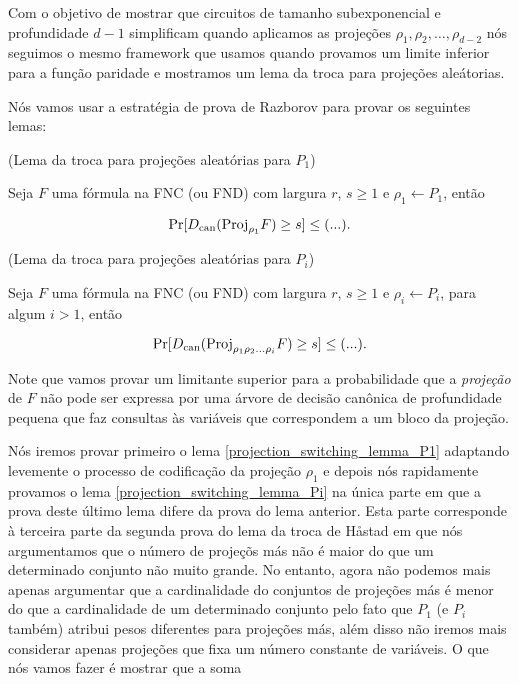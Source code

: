 Com o objetivo de mostrar que circuitos de tamanho subexponencial e profundidade $d - 1$ simplificam quando aplicamos as projeções $\rho_{1}, \rho_{2}, \dots, \rho_{d - 2}$ nós seguimos o mesmo framework que usamos quando provamos um limite inferior para a função paridade e mostramos um lema da troca para projeções aleátorias.

Nós vamos usar a estratégia de prova de Razborov para provar os seguintes lemas:

\begin{lema} (Lema da troca para projeções aleatórias para $P_{1}$) \label{projection_switching_lemma_P1}

Seja $F$ uma fórmula na FNC (ou FND) com largura $r$, $s \geq 1$ e $\rho_{1} \leftarrow P_{1}$, então

\begin{equation*}
	\Pr[D_{\text{can}}(\text{Proj}_{\rho_{1}}F) \geq s] \leq (...).
\end{equation*} 

\end{lema}

\begin{lema} (Lema da troca para projeções aleatórias para $P_{i}$) \label{projection_switching_lemma_Pi}

Seja $F$ uma fórmula na FNC (ou FND) com largura $r$, $s \geq 1$ e $\rho_{i} \leftarrow P_{i}$, para algum $i > 1$, então

\begin{equation*}
	\Pr[D_{\text{can}}(\text{Proj}_{\rho_{1}\rho_{2}\dots\rho_{i}}F) \geq s] \leq (...).
\end{equation*} 

\end{lema}

Note que vamos provar um limitante superior para a probabilidade que a \emph{projeção} de $F$ não pode ser expressa por uma árvore de decisão canônica de profundidade pequena que faz consultas às variáveis que correspondem a um bloco da projeção.

Nós iremos provar primeiro o lema \ref{projection_switching_lemma_P1} adaptando levemente o processo de codificação da projeção $\rho_{1}$ e depois nós rapidamente provamos o lema \ref{projection_switching_lemma_Pi} na única parte em que a prova deste último lema difere da prova do lema anterior. Esta parte corresponde à terceira parte da segunda prova do lema da troca de Håstad em que nós argumentamos que o número de projeçõs más não é maior do que um determinado conjunto não muito grande. No entanto, agora não podemos mais apenas argumentar que a cardinalidade do conjuntos de projeções más é menor do que a cardinalidade de um determinado conjunto pelo fato que $P_{1}$ (e $P_{i}$ também) atribui pesos diferentes para projeções más, além disso não iremos mais considerar apenas projeções que fixa um número constante de variáveis. O que nós vamos fazer é mostrar que a soma

